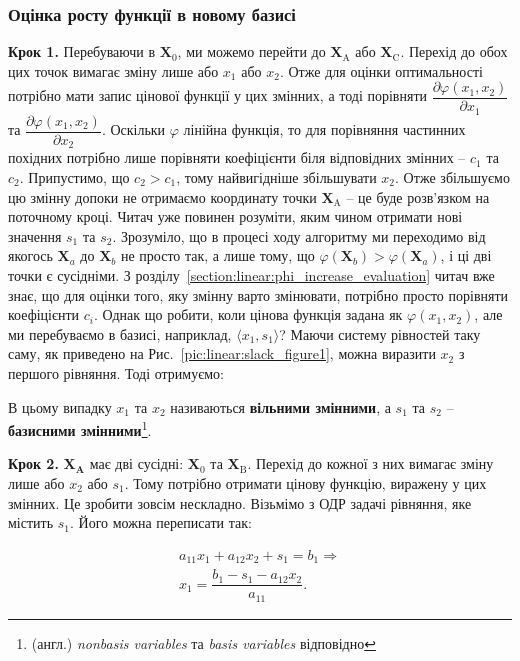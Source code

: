 \documentclass[\main/book.tex]{subfiles}
\begin{document}
\subsubsection{Оцінка росту функції в новому базисі}

\textbf{Крок 1.} \quad Перебуваючи в $\mathbf{X}_0$, ми можемо перейти до $\mathbf{X}_\mathrm{A}$ або $\mathbf{X}_\mathrm{C}$. Перехід до обох цих точок вимагає зміну лише або $x_1$ або $x_2$. Отже для оцінки оптимальності потрібно мати запис цінової функції у цих змінних, а тоді порівняти $\dfrac{\partial \varphi(x_1, x_2)}{\partial x_1}$ та $\dfrac{\partial \varphi(x_1, x_2)}{\partial x_2}$. Оскільки $\varphi$ лінійна функція, то для порівняння частинних похідних потрібно лише порівняти коефіцієнти біля відповідних змінних -- $c_1$ та $c_2$. Припустимо, що $c_2 > c_1$, тому найвигідніше збільшувати $x_2$. Отже збільшуємо цю змінну допоки не отримаємо координату точки $\mathbf{X}_\mathrm{A}$ -- це буде розв'язком на поточному кроці. Читач уже повинен розуміти, яким чином отримати нові значення $s_1$ та $s_2$.
Зрозуміло, що в процесі ходу алгоритму ми переходимо від якогось $\mathbf{X}_a$ до $\mathbf{X}_b$ не просто так, а лише тому, що $\varphi(\mathbf{X}_b) > \varphi(\mathbf{X}_a)$, і ці дві точки є сусідніми. З розділу~\ref{section:linear:phi_increase_evaluation} читач вже знає, що для оцінки того, яку змінну варто змінювати, потрібно просто порівняти коефіцієнти $c_i$. Однак що робити, коли цінова функція задана як $\varphi(x_1, x_2)$, але ми перебуваємо в базисі, наприклад, $\langle x_1, s_1 \rangle$? Маючи систему рівностей таку саму, як приведено на Рис.~\ref{pic:linear:slack_figure1}, можна виразити $x_2$ з першого рівняння. Тоді отримуємо:

В цьому випадку $x_1$ та $x_2$ називаються \textbf{вільними змінними}, а $s_1$ та $s_2$ -- \textbf{базисними змінними}\footnote{(англ.) \textit{nonbasis variables} та \textit{basis variables} відповідно}.

\textbf{Крок 2.}  $\mathbf{X}_\mathbf{A}$ має дві сусідні: $\mathbf{X}_0$ та $\mathbf{X}_\mathrm{B}$. Перехід до кожної з них вимагає зміну лише або $x_2$ або $s_1$. Тому потрібно отримати цінову функцію, виражену у цих змінних. Це зробити зовсім нескладно. Візьмімо з ОДР задачі рівняння, яке містить $s_1$. Його можна переписати так:
 
 \[
 \begin{split}
  a_{11} x_1 + a_{12} x_2 + s_1 = b_1 \Rightarrow \\
  x_1 = \dfrac{b_1 - s_1 - a_{12} x_2}{a_{11}}.
 \end{split}
 \]
 
\end{document}
